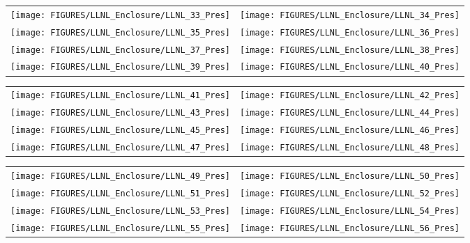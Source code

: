 \begin{figure}[p]
\begin{tabular*}{\textwidth}{l@{\extracolsep{\fill}}r}
\texttt{[image: FIGURES/LLNL\_Enclosure/LLNL\_33\_Pres]} &
\texttt{[image: FIGURES/LLNL\_Enclosure/LLNL\_34\_Pres]} \\
\texttt{[image: FIGURES/LLNL\_Enclosure/LLNL\_35\_Pres]} &
\texttt{[image: FIGURES/LLNL\_Enclosure/LLNL\_36\_Pres]} \\
\texttt{[image: FIGURES/LLNL\_Enclosure/LLNL\_37\_Pres]} &
\texttt{[image: FIGURES/LLNL\_Enclosure/LLNL\_38\_Pres]} \\
\texttt{[image: FIGURES/LLNL\_Enclosure/LLNL\_39\_Pres]} &
\texttt{[image: FIGURES/LLNL\_Enclosure/LLNL\_40\_Pres]}
\end{tabular*}
\label{LLNL_Enclosure_Pres_5}
\end{figure}

\begin{figure}[p]
\begin{tabular*}{\textwidth}{l@{\extracolsep{\fill}}r}
\texttt{[image: FIGURES/LLNL\_Enclosure/LLNL\_41\_Pres]} &
\texttt{[image: FIGURES/LLNL\_Enclosure/LLNL\_42\_Pres]} \\
\texttt{[image: FIGURES/LLNL\_Enclosure/LLNL\_43\_Pres]} &
\texttt{[image: FIGURES/LLNL\_Enclosure/LLNL\_44\_Pres]} \\
\texttt{[image: FIGURES/LLNL\_Enclosure/LLNL\_45\_Pres]} &
\texttt{[image: FIGURES/LLNL\_Enclosure/LLNL\_46\_Pres]} \\
\texttt{[image: FIGURES/LLNL\_Enclosure/LLNL\_47\_Pres]} &
\texttt{[image: FIGURES/LLNL\_Enclosure/LLNL\_48\_Pres]}
\end{tabular*}
\label{LLNL_Enclosure_Pres_6}
\end{figure}

\begin{figure}[p]
\begin{tabular*}{\textwidth}{l@{\extracolsep{\fill}}r}
\texttt{[image: FIGURES/LLNL\_Enclosure/LLNL\_49\_Pres]} &
\texttt{[image: FIGURES/LLNL\_Enclosure/LLNL\_50\_Pres]} \\
\texttt{[image: FIGURES/LLNL\_Enclosure/LLNL\_51\_Pres]} &
\texttt{[image: FIGURES/LLNL\_Enclosure/LLNL\_52\_Pres]} \\
\texttt{[image: FIGURES/LLNL\_Enclosure/LLNL\_53\_Pres]} &
\texttt{[image: FIGURES/LLNL\_Enclosure/LLNL\_54\_Pres]} \\
\texttt{[image: FIGURES/LLNL\_Enclosure/LLNL\_55\_Pres]} &
\texttt{[image: FIGURES/LLNL\_Enclosure/LLNL\_56\_Pres]}
\end{tabular*}
\label{LLNL_Enclosure_Pres_7}
\end{figure}


